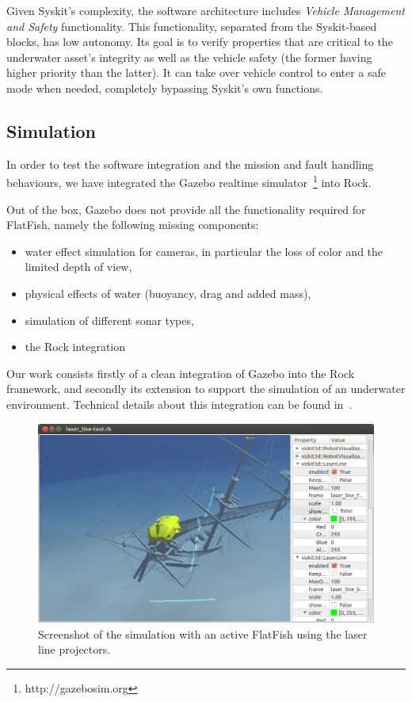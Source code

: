 \documentclass[conference]{IEEEtran}
\begin{document}
Given Syskit's complexity, the software architecture includes \emph{Vehicle Management
and Safety} functionality. This functionality, separated from the Syskit-based blocks, has
low autonomy. Its goal is to verify properties that are critical to the underwater asset's
integrity as well as the vehicle safety (the former having higher priority than the
latter). It can take over vehicle control to enter a safe mode when needed,
completely bypassing Syskit's own functions.

\subsection{Simulation}

In order to test the software integration and the mission and fault handling behaviours,
we have integrated the Gazebo realtime simulator~\footnote{http://gazebosim.org} into Rock.

Out of the box, Gazebo does not provide all the functionality required for FlatFish,
namely the following missing components:
\begin{itemize}
    \item water effect simulation for cameras, in particular the loss of color and the
        limited depth of view,
    \item physical effects of water (buoyancy, drag and added mass),
    \item simulation of different sonar types,
    \item the Rock integration
\end{itemize}

Our work consists firstly of a clean integration of Gazebo into the Rock framework, and
secondly its extension to support the simulation of an underwater environment. Technical
details about this integration can be found in~\cite{watanabe2015}.

\begin{figure}[!t]
	\centering
	\includegraphics[width=0.9\columnwidth]{flatfish_simulation}
	\caption{Screenshot of the simulation with an active FlatFish using the laser line 
	projectors.}
	\label{fig:simulation}
\end{figure}
\end{document}
